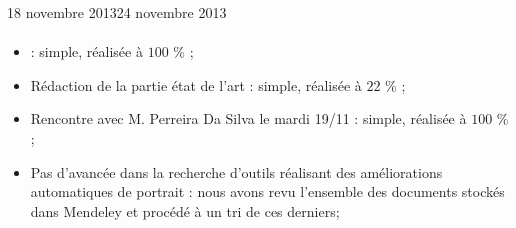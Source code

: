 \documentclass[12pt]{fiche-rd-info}
\begin{document}

\begin{fichesuivi}{18 novembre 2013}{24 novembre 2013}
	

\paragraph{}
	\begin{travaileffectue}
		\begin{itemize}
			\item  : simple, réalisée à $100$ \% ;
			\item Rédaction de la partie état de l’art : simple, réalisée à $22$ \% ;
			\item Rencontre avec M. Perreira Da Silva le mardi 19/11 : simple, réalisée à $100$ \% ;
		\end{itemize}
	\end{travaileffectue}

\begin{travailnoneffectue}
		\begin{itemize}
			\item Pas d’avancée dans la recherche d'outils réalisant des améliorations automatiques de portrait : nous avons revu l’ensemble des documents stockés dans Mendeley et procédé à un tri de ces derniers;
		\end{itemize}
	\end{travailnoneffectue}
		

\end{fichesuivi}
\end{document}
